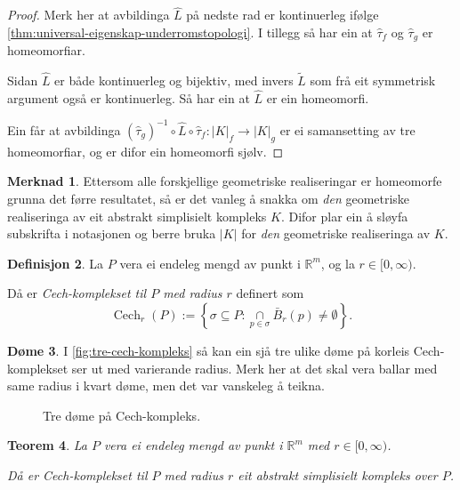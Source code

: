 \documentclass[a4paper, 12pt, norsk]{article}
\theoremstyle{plain}
\newtheorem{theorem}{Teorem}[section]
\theoremstyle{definition}
\newtheorem{definition}[theorem]{Definisjon}
\newtheorem{example}[theorem]{Døme}
\newtheorem{remark}[theorem]{Merknad}
\newcommand{\Rb}{\mathbb{R}}
\newcommand{\intersect}{ \mathop{\cap}\limits }
\newcommand{\gr}[1]{ \lvert #1 \rvert } %
\DeclareMathOperator{\Cech}{Cech} %
\begin{document}
\begin{proof}
	Merk her at avbildinga \( \hat{L} \) på nedste rad er kontinuerleg ifølge \autoref{thm:universal-eigenskap-underromstopologi}. I tillegg så har ein at \( \hat{\tau}_f \) og \( \hat{\tau}_g \) er homeomorfiar.

	Sidan $\hat{L}$ er både kontinuerleg og bijektiv, med invers $\tilde{L}$ som frå eit symmetrisk argument også er kontinuerleg. Så har ein at $\hat{L}$ er ein homeomorfi.

	Ein får at avbildinga $(\hat{\tau}_g)^{-1}\circ\hat{L}\circ\hat{\tau}_f:\gr{K}_f\to\gr{K}_g$ er ei samansetting av tre homeomorfiar, og er difor ein homeomorfi sjølv.
\end{proof}

\begin{remark}
	Ettersom alle forskjellige geometriske realiseringar er homeomorfe grunna det førre resultatet, så er det vanleg å snakka om \emph{den} geometriske realiseringa av eit abstrakt simplisielt kompleks $K$. Difor plar ein å sløyfa subskrifta i notasjonen og berre bruka $\gr{K}$ for \emph{den} geometriske realiseringa av $K$.
\end{remark}

\begin{definition} \label{def:cech}
	La \( P \) vera ei endeleg mengd av punkt i \( \Rb^m \), og la \( r \in [0, \infty) \).
	
	Då er \emph{Cech-komplekset til $P$ med radius $r$} definert som
	\[
		\Cech_r(P) := \left\{\sigma\subseteq P : \intersect_{p\in\sigma}\bar{B}_r(p)\neq\emptyset\right\}.
	\]
\end{definition}

\begin{example}
	 I \autoref{fig:tre-cech-kompleks} så kan ein sjå tre ulike døme på korleis Cech-komplekset ser ut med varierande radius. Merk her at det skal vera ballar med same radius i kvart døme, men det var vanskeleg å teikna.
	\begin{figure}[htbp]
		\begin{center}
			
		\end{center}
		\caption{Tre døme på Cech-kompleks.}
		\label{fig:tre-cech-kompleks}
	\end{figure}
\end{example}

\begin{theorem} \label{thm:CASK}
	La \( P \) vera ei endeleg mengd av punkt i \( \Rb^m \) med \( r \in [0, \infty) \).
	
	Då er Cech-komplekset til $P$ med radius $r$ eit abstrakt simplisielt kompleks over $P$.
\end{theorem}
\end{document}

